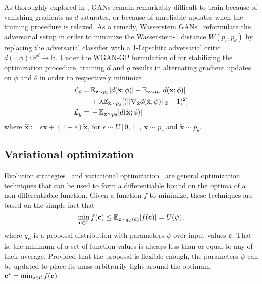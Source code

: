 \documentclass[twocolumn,superscriptaddress,aps]{revtex4-1}
\theoremstyle{plain}
\begin{document}
As thoroughly explored in \citep{2017arXiv170104862A}, GANs remain remarkably
difficult to train because of vanishing gradients as $d$ saturates, or because of
unreliable updates when the training procedure is relaxed. As a remedy,
Wasserstein GANs~\citep{2017arXiv170107875A} reformulate the adversarial
setup in order to minimize the Wasserstein-1 distance $W(p_r, p_\theta)$ by
replacing the adversarial classifier with a 1-Lipschitz adversarial critic
$d(\cdot; \phi) : \mathbb{R}^d \to \mathbb{R}$. Under the WGAN-GP formulation of \cite{2017arXiv170400028G}
for stabilizing the optimization procedure,
training $d$ and $g$ results in alternating gradient updates on $\phi$ and $\theta$ in order to respectively minimize
\begin{align}
    {\cal L}_d =\,& \mathbb{E}_{\tilde{\mathbf{x}} \sim p_\theta} [d(\tilde{\mathbf{x}};\phi)] - \mathbb{E}_{\mathbf{x} \sim p_r} [d(\mathbf{x};\phi)]  \nonumber \\
                  & + \lambda \mathbb{E}_{\hat{\mathbf{x}} \sim p_{\hat{\mathbf{x}}}} [(|| \nabla_{\hat{\mathbf{x}}} d({\hat{\mathbf{x}}};\phi) ||_2 - 1)^2] \\
    {\cal L}_g =\,& -\mathbb{E}_{\tilde{\mathbf{x}} \sim p_\theta} [d(\tilde{\mathbf{x}};\phi)]
\end{align}
where ${\hat{\mathbf{x}}} := \epsilon \mathbf{x} + (1-\epsilon)\tilde{\mathbf{x}}$, for $\epsilon \sim U[0,1]$, $\mathbf{x} \sim p_r$ and $\tilde{\mathbf{x}} \sim p_\theta$.


\subsection{Variational optimization}

Evolution strategies~\citep{2011arXiv1106.4487W} and variational optimization~\cite{2012arXiv1212.4507S} are general
optimization techniques that can be used to form a differentiable bound
on the optima of a non-differentiable function. Given a function $f$ to minimize,
these techniques are based on the simple fact that
\begin{equation}
    \min_{\mathbf{c} \in {\cal C}} f(\mathbf{c}) \leq \mathbb{E}_{\mathbf{c} \sim q_\psi(\mathbf{c})} [f(\mathbf{c})] = U(\psi),
\end{equation}
where $q_\psi$ is a proposal distribution with parameters $\psi$ over input values $\mathbf{c}$.
That is, the minimum of a set of function values is always less than or equal
to any of their average. Provided that the proposal is flexible enough, the parameters $\psi$
can be updated to place its mass arbitrarily tight around the optimum $\mathbf{c}^* = \min_{\mathbf{c} \in {\cal C}} f(\mathbf{c})$.
\end{document}
